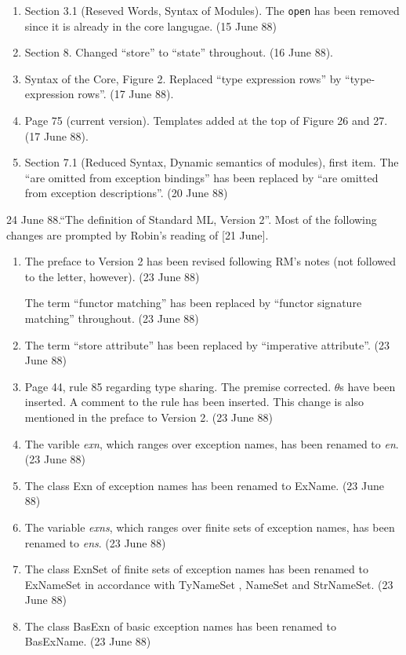 \begin{description}
\begin{enumerate}
\item
Section 3.1 (Reseved Words, Syntax of Modules). The {\tt open}
has been removed since it is already in the core langugae.
(15 June 88)

\item
Section 8. Changed ``store'' to ``state'' throughout. (16 June 88).

\item
Syntax of the Core, Figure 2. Replaced ``type expression rows''
by ``type-expression rows''. (17 June 88).

\item
Page 75 (current version). Templates added at the top of Figure 26 and 27.
(17 June 88).

\item
Section 7.1 (Reduced Syntax, Dynamic semantics of modules), first
item. The ``are omitted from exception bindings'' has been replaced
by ``are omitted from exception descriptions''. (20 June 88)
\end{enumerate}

\item{24 June 88.}``The definition of Standard ML, Version 2''.
Most of the following changes are prompted by Robin's reading
of [21 June]. 
\begin{enumerate}
\item 
The preface to Version 2 has been revised following RM's notes (not
followed to the letter, however). (23 June 88)

The term ``functor matching'' has been replaced by ``functor signature
matching'' throughout. (23 June 88)

\item
The term ``store attribute'' has been replaced by ``imperative attribute''.
(23 June 88)

\item
Page 44, rule 85 regarding type sharing. The premise corrected. $\theta$s
have been inserted. A comment to the rule has been inserted. This change
is also mentioned in the preface to Version 2.
(23 June 88)

\item
The varible {\it exn}, which ranges over exception names, has been
renamed to {\it en}. (23 June 88)

\item
The class Exn of exception names has been renamed to ExName.
 (23 June 88)
\item
The variable {\it exns}, which ranges over finite sets of exception
names, has been renamed to {\it ens}.
 (23 June 88)
\item 
The class ExnSet of finite sets of exception names has been renamed
to ExNameSet in accordance with TyNameSet , NameSet and StrNameSet.
 (23 June 88)
\item
The class BasExn of basic exception names has been renamed
to BasExName.
 (23 June 88)
\end{enumerate}


\end{description}
